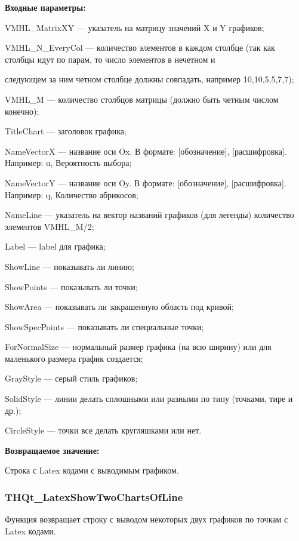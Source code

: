 \documentclass[a4paper,12pt]{article}
\begin{document}
\textbf{Входные параметры:}
 
VMHL\_MatrixXY --- указатель на матрицу значений X и Y графиков;
 
VMHL\_N\_EveryCol --- количество элементов в каждом столбце (так как столбцы идут по парам, то число элементов в нечетном и
 
следующем за ним четном столбце должны совпадать, например 10,10,5,5,7,7);
 
VMHL\_M --- количество столбцов матрицы (должно быть четным числом конечно);
 
TitleChart --- заголовок графика;
 
NameVectorX --- название оси Ox. В формате: [обозначение], [расшифровка]. Например: u, Вероятность выбора;
 
NameVectorY --- название оси Oy. В формате: [обозначение], [расшифровка]. Например: q, Количество абрикосов;
 
NameLine --- указатель на вектор названий графиков (для легенды) количество элементов VMHL\_M/2;
 
Label --- label для графика;
 
ShowLine --- показывать ли линию;
 
ShowPoints --- показывать ли точки;
 
ShowArea --- показывать ли закрашенную область под кривой;
 
ShowSpecPoints --- показывать ли специальные точки;
 
ForNormalSize --- нормальный размер графика (на всю ширину) или для маленького размера график создается;
 
GrayStyle --- серый стиль графиков;
 
SolidStyle --- линии делать сплошными или разными по типу (точками, тире и др.);
 
CircleStyle --- точки все делать кругляшками или нет.
	
\textbf{Возвращаемое значение:}

Строка с Latex кодами с выводимым графиком.


\subsubsection{THQt\_LatexShowTwoChartsOfLine}\label{THQt_LatexShowTwoChartsOfLine}

Функция возвращает строку с выводом некоторых двух графиков по точкам с Latex кодами.
\end{document}
